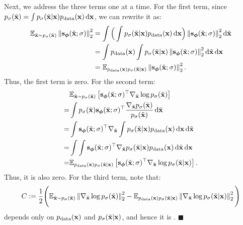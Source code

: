 Next, we address the three terms one at a time. For the first term, since $p_\sigma(\tilde{{\mathbf{x}}}) = \int p_{\sigma}(\tilde{{\mathbf{x}}} | {\mathbf{x}}) p_{\text{data}}({\mathbf{x}}) \mathop{}\!\mathrm{d}{\mathbf{x}}$, we can rewrite it as:
\begin{align*}
    \mathbb{E}_{\tilde{{\mathbf{x}}} \sim p_\sigma(\tilde{{\mathbf{x}}})} \left\lVert{\mathbf{s}}_{\bm{\phi}}(\tilde{{\mathbf{x}}}; \sigma)\right\rVert_2^2 
    &= \int \Big( \int p_{\sigma}(\tilde{{\mathbf{x}}} | {\mathbf{x}}) p_{\text{data}}({\mathbf{x}})  \mathop{}\!\mathrm{d}{\mathbf{x}} \Big) \left\lVert{\mathbf{s}}_{\bm{\phi}}(\tilde{{\mathbf{x}}}; \sigma)\right\rVert_2^2 \mathop{}\!\mathrm{d} \tilde{{\mathbf{x}}} 
    \\ &= \int p_{\text{data}}({\mathbf{x}}) \int p_{\sigma}(\tilde{{\mathbf{x}}} | {\mathbf{x}}) \left\lVert{\mathbf{s}}_{\bm{\phi}}(\tilde{{\mathbf{x}}}; \sigma)\right\rVert_2^2 \mathop{}\!\mathrm{d} \tilde{{\mathbf{x}}} \mathop{}\!\mathrm{d}{\mathbf{x}}
    \\ &= \mathbb{E}_{ p_{\text{data}}({\mathbf{x}})p_{\sigma}(\tilde{{\mathbf{x}}} | {\mathbf{x}})} \left\lVert{\mathbf{s}}_{\bm{\phi}}(\tilde{{\mathbf{x}}}; \sigma)\right\rVert_2^2.
\end{align*}
Thus, the first term is zero. For the second term:
\begin{align}\label{eq:dsm-sec-term}
\begin{aligned}
          &\mathbb{E}_{\tilde{{\mathbf{x}}} \sim p_\sigma(\tilde{{\mathbf{x}}})}\left[ {\mathbf{s}}_{\bm{\phi}}(\tilde{{\mathbf{x}}}; \sigma)^\top  \nabla_{\tilde{{\mathbf{x}}}} \log p_\sigma(\tilde{{\mathbf{x}}}) \right] 
      \\=&\int  p_\sigma(\tilde{{\mathbf{x}}}) {\mathbf{s}}_{\bm{\phi}}(\tilde{{\mathbf{x}}}; \sigma)^\top  \frac{\nabla_{\tilde{{\mathbf{x}}}} p_\sigma(\tilde{{\mathbf{x}}})}{p_\sigma(\tilde{{\mathbf{x}}})}  \mathop{}\!\mathrm{d}\tilde{{\mathbf{x}}}
        \\=&\int   {\mathbf{s}}_{\bm{\phi}}(\tilde{{\mathbf{x}}}; \sigma)^\top  \nabla_{\tilde{{\mathbf{x}}}} \int p_{\sigma}(\tilde{{\mathbf{x}}} | {\mathbf{x}}) p_{\text{data}}({\mathbf{x}}) \mathop{}\!\mathrm{d}{\mathbf{x}} \mathop{}\!\mathrm{d}\tilde{{\mathbf{x}}}
    \\=&\int \int  {\mathbf{s}}_{\bm{\phi}}(\tilde{{\mathbf{x}}}; \sigma)^\top    \nabla_{\tilde{{\mathbf{x}}}}p_{\sigma}(\tilde{{\mathbf{x}}} | {\mathbf{x}}) p_{\text{data}}({\mathbf{x}}) \mathop{}\!\mathrm{d}\tilde{{\mathbf{x}}} \mathop{}\!\mathrm{d}{\mathbf{x}} 
      \\=  &\mathbb{E}_{ p_{\text{data}}({\mathbf{x}})p_{\sigma}(\tilde{{\mathbf{x}}} | {\mathbf{x}})}\left[ {\mathbf{s}}_{\bm{\phi}}(\tilde{{\mathbf{x}}}; \sigma)^\top  \nabla_{\tilde{{\mathbf{x}}}} \log p_\sigma(\tilde{{\mathbf{x}}}| {\mathbf{x}})\right].
\end{aligned}
\end{align}
Thus, it is also zero. For the third term, note that:
\[
C:=\frac{1}{2}\Bigg(\mathbb{E}_{\tilde{{\mathbf{x}}} \sim p_\sigma(\tilde{{\mathbf{x}}})}  \left\lVert\nabla_{\tilde{{\mathbf{x}}}} \log p_\sigma(\tilde{{\mathbf{x}}})\right\rVert_2^2  -  \mathbb{E}_{ p_{\text{data}}({\mathbf{x}})p_{\sigma}(\tilde{{\mathbf{x}}} | {\mathbf{x}})} \left\lVert\nabla_{\tilde{{\mathbf{x}}}} \log p_{\sigma}(\tilde{{\mathbf{x}}} | {\mathbf{x}})\right\rVert_2^2   \Bigg)
\]
depends only on $p_{\text{data}}({\mathbf{x}})$ and $p_{\sigma}(\tilde{{\mathbf{x}}}|{\mathbf{x}})$, and hence it is .
\hfill$\blacksquare$

